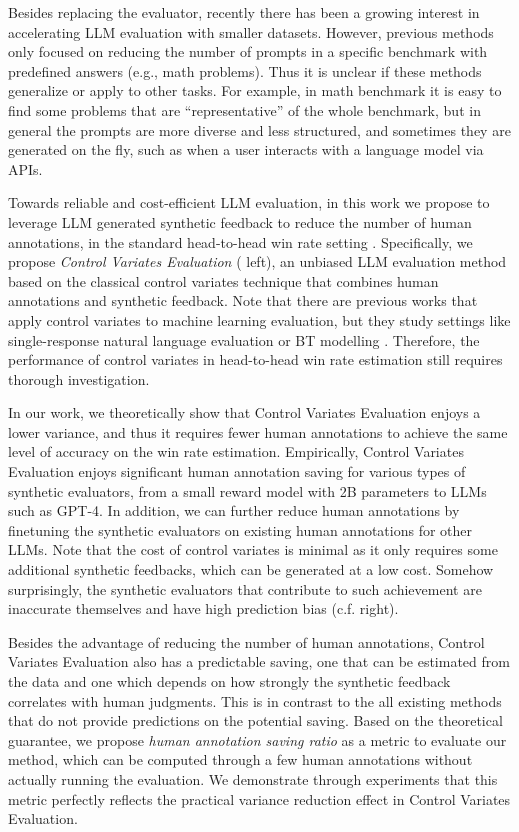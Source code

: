 Besides replacing the evaluator, recently there has been a growing interest in accelerating LLM evaluation \citep{ye-etal-2023-predictable,polo2024tinybenchmarks,zhou2024speeding} with smaller datasets. However, previous methods only focused on reducing the number of prompts in a specific benchmark with predefined answers (e.g., math problems). Thus it is unclear if these methods generalize or apply to other tasks. For example, in math benchmark it is easy to find some problems that are ``representative'' of the whole benchmark, but in general the prompts are more diverse and less structured, and sometimes they are generated on the fly, such as when a user interacts with a language model via APIs. \loose

Towards reliable and cost-efficient LLM evaluation, in this work we propose to leverage LLM generated synthetic feedback to reduce the number of human annotations, in the standard head-to-head win rate setting \citep{chiang2024chatbot}. Specifically, we propose \emph{Control Variates Evaluation} ( left), an unbiased LLM evaluation method based on the classical control variates technique  \citep{lavenberg1981perspective} that combines human annotations and synthetic feedback. Note that there are previous works \citep{chaganty2018price, boyeau2024autoeval} that apply control variates to machine learning evaluation, but they study settings like single-response natural language evaluation or BT modelling \citep{bradley1952rank}. Therefore, the performance of control variates in head-to-head win rate estimation still requires thorough investigation.

In our work, we theoretically show that Control Variates Evaluation enjoys a lower variance, and thus it requires fewer human annotations to achieve the same level of accuracy on the win rate estimation. 
Empirically, Control Variates Evaluation enjoys significant human annotation saving for various types of synthetic evaluators, from a small reward model with 2B parameters to LLMs such as GPT-4. In addition, we can further reduce human annotations by finetuning the synthetic evaluators on existing human annotations for other LLMs. Note that the cost of control variates is minimal as it only requires some additional synthetic feedbacks, which can be generated at a low cost. Somehow surprisingly, the synthetic evaluators that contribute to such achievement are inaccurate themselves and have high prediction bias (c.f.  right). 
 \loose

Besides the advantage of reducing the number of human annotations, Control Variates Evaluation also has a predictable saving, one that can be estimated from the data and one which depends on how strongly the synthetic feedback correlates with human judgments. This is in contrast to the all existing methods that do not provide predictions  on the potential saving. Based on the theoretical guarantee, we propose \emph{human annotation saving ratio} as a metric to evaluate our method, which can be computed through a few human annotations without actually running the evaluation. We demonstrate through experiments that this metric perfectly reflects the practical variance reduction effect in Control Variates Evaluation. \loose

